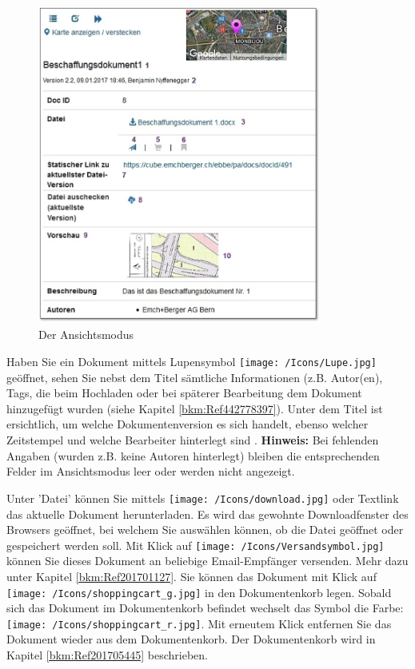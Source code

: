 \begin{figure}
\vspace{-15pt}
\includegraphics[height=105mm]{../chapters/11_Dokumentenablage/pictures/11-2-5_Dokumentenansicht.jpg}
\vspace{-5pt}
\caption{Der Ansichtsmodus}
\end{figure}

Haben Sie ein Dokument mittels Lupensymbol \texttt{[image: /Icons/Lupe.jpg]} geöffnet, sehen Sie nebst dem Titel  sämtliche Informationen (z.B. Autor(en), Tags, die beim Hochladen oder bei späterer Bearbeitung dem Dokument hinzugefügt wurden (siehe Kapitel \ref{bkm:Ref442778397}). Unter dem Titel ist ersichtlich, um welche Dokumentenversion es sich handelt, ebenso welcher Zeitstempel und welche Bearbeiter hinterlegt sind . \textbf{Hinweis:} Bei fehlenden Angaben (wurden z.B. keine Autoren hinterlegt) bleiben die entsprechenden Felder im Ansichtsmodus leer oder werden nicht angezeigt. \newline

Unter 'Datei' können Sie mittels \texttt{[image: /Icons/download.jpg]} oder Textlink  das aktuelle Dokument herunterladen. Es wird das gewohnte Downloadfenster des Browsers geöffnet, bei welchem Sie auswählen können, ob die Datei geöffnet oder gespeichert werden soll. Mit Klick auf \texttt{[image: /Icons/Versandsymbol.jpg]}  können Sie dieses Dokument an beliebige Email-Empfänger versenden. Mehr dazu unter Kapitel \ref{bkm:Ref201701127}. Sie können das Dokument mit Klick auf \texttt{[image: /Icons/shoppingcart\_g.jpg]}  in den Dokumentenkorb legen. Sobald sich das Dokument im Dokumentenkorb befindet wechselt das Symbol die Farbe: \texttt{[image: /Icons/shoppingcart\_r.jpg]}. Mit erneutem Klick entfernen Sie das Dokument wieder aus dem Dokumentenkorb. Der Dokumentenkorb wird in Kapitel \ref{bkm:Ref201705445} beschrieben. \newline


